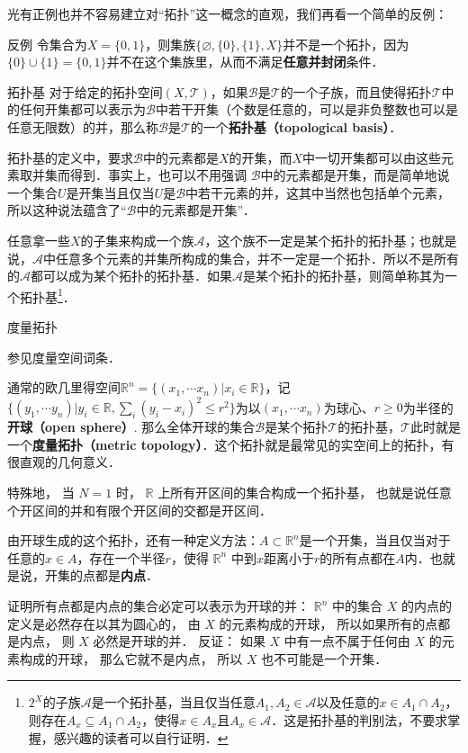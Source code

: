 光有正例也并不容易建立对“拓扑”这一概念的直观，我们再看一个简单的反例：

\begin{example}{反例}
令集合为$X=\{0, 1\}$，则集族$\{\varnothing, \{0\},\{1\}, X\}$并不是一个拓扑，因为$\{0\}\cup\{1\}=\{0,1\}$并不在这个集族里，从而不满足\textbf{任意并封闭}条件．
\end{example}

\begin{definition}{拓扑基}\label{Topol_def2}
对于给定的拓扑空间$(X, \mathcal{T})$，如果$\mathcal{B}$是$\mathcal{T}$的一个子族，而且使得拓扑$\mathcal{T}$中的任何开集都可以表示为$\mathcal{B}$中若干开集（个数是任意的，可以是非负整数也可以是任意无限数）的并，那么称$\mathcal{B}$是$\mathcal{T}$的一个\textbf{拓扑基（topological basis）}．
\end{definition}

拓扑基的定义中，要求$\mathcal{B}$中的元素都是$X$的开集，而$X$中一切开集都可以由这些元素取并集而得到．事实上，也可以不用强调
$\mathcal{B}$中的元素都是开集，而是简单地说一个集合$U$是开集当且仅当$U$是$\mathcal{B}$中若干元素的并，这其中当然也包括单个元素，所以这种说法蕴含了“$\mathcal{B}$中的元素都是开集”．

任意拿一些$X$的子集来构成一个族$\mathcal{A}$，这个族不一定是某个拓扑的拓扑基；也就是说，$\mathcal{A}$中任意多个元素的并集所构成的集合，并不一定是一个拓扑．所以不是所有的$\mathcal{A}$都可以成为某个拓扑的拓扑基．如果$\mathcal{A}$是某个拓扑的拓扑基，则简单称其为一个拓扑基\footnote{$2^X$的子族$\mathcal{A}$是一个拓扑基，当且仅当任意$A_1, A_2\in\mathcal{A}$以及任意的$x\in A_1\cap A_2$，则存在$A_x\subseteq A_1\cap A_2$，使得$x\in A_x$且$A_x\in \mathcal{A}$．这是拓扑基的判别法，不要求掌握，感兴趣的读者可以自行证明．}．


\begin{example}{度量拓扑}

参见度量空间词条．

通常的欧几里得空间$\mathbb{R}^n=\{(x_1, \cdots x_n)|x_i\in \mathbb{R}\}$，记$\{(y_1, \cdots y_n)|y_i\in \mathbb{R}, \sum_i(y_i-x_i)^2\leq r^2\}$为以$(x_1, \cdots x_n)$为球心、$r\geqslant 0$为半径的\textbf{开球（open sphere）}. 那么全体开球的集合$\mathcal{B}$是某个拓扑$\mathcal{T}$的拓扑基，$\mathcal{T}$此时就是一个\textbf{度量拓扑（metric topology）}．这个拓扑就是最常见的实空间上的拓扑，有很直观的几何意义．

特殊地， 当 $N = 1$ 时， $\mathbb R$ 上所有开区间的集合构成一个拓扑基， 也就是说任意个开区间的并和有限个开区间的交都是开区间．

由开球生成的这个拓扑，还有一种定义方法：$A\subset \mathbb{R}^n$是一个开集，当且仅当对于任意的$x\in A$，存在一个半径$r$，使得 $\mathbb R^n$ 中到$x$距离小于$r$的所有点都在$A$内．也就是说，开集的点都是\textbf{内点}．

证明所有点都是内点的集合必定可以表示为开球的并： $\mathbb R^n$ 中的集合 $X$ 的内点的定义是必然存在以其为圆心的， 由 $X$ 的元素构成的开球， 所以如果所有的点都是内点， 则 $X$ 必然是开球的并． 反证： 如果 $X$ 中有一点不属于任何由 $X$ 的元素构成的开球， 那么它就不是内点， 所以 $X$ 也不可能是一个开集．
\end{example}

